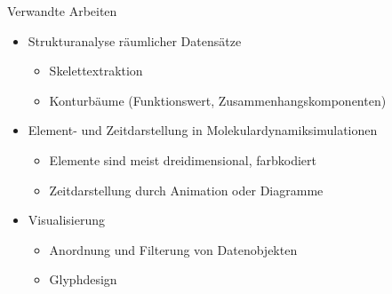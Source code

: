 \documentclass[10pt]{beamer}
\begin{document}
%
%
%
%
%
%
\begin{frame}{Verwandte Arbeiten}
	\begin{itemize}
		\item<1-> Strukturanalyse räumlicher Datensätze
		\begin{itemize}
			\item Skelettextraktion
			\item Konturbäume (Funktionswert, Zusammenhangskomponenten)
		\end{itemize}
		\item<2-> Element- und Zeitdarstellung in Molekulardynamiksimulationen
		\begin{itemize}
			\item Elemente sind meist dreidimensional, farbkodiert
			\item Zeitdarstellung durch Animation oder Diagramme
		\end{itemize}
		\item<3-> Visualisierung
		\begin{itemize}
			\item Anordnung und Filterung von Datenobjekten
			\item Glyphdesign
		\end{itemize}
	\end{itemize}
\end{frame}
\end{document}
